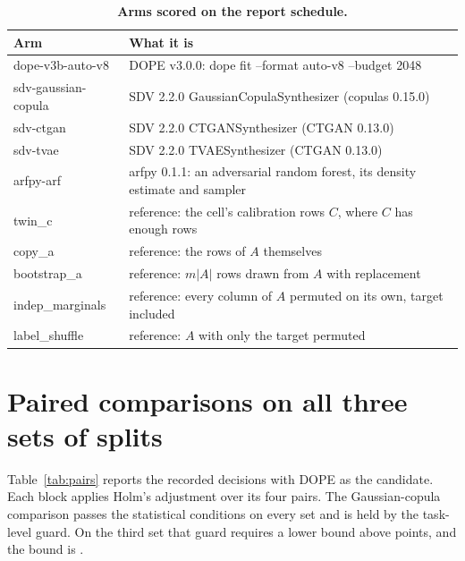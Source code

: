 \documentclass[10pt,letterpaper,twocolumn]{article}
\newcommand{\ct}[1]{{\bfseries\color{ink}#1}}   %
\newcommand{\tcli}[1]{{\ttfamily\fontsize{7.4}{9.4}\selectfont #1}}
\newcommand{\tablefont}{\fontsize{8.1}{10.2}\selectfont}
\newcommand{\thd}[1]{{\sffamily\bfseries\fontsize{7.2}{9}\selectfont\color{ink}#1}}  %
\begin{document}
\begin{table}[t]
\caption{\ct{Arms scored on the report schedule.}}\label{tab:arms}
\tablefont
\begin{tabularx}{\columnwidth}{@{}L{2.75cm}Y@{}}
\toprule
\thd{Arm} & \thd{What it is}\\
\midrule
\tcli{dope-v3b-auto-v8} & DOPE v3.0.0: \tcli{dope fit --format auto-v8 --budget 2048}\\
\tcli{sdv-gaussian-copula} & SDV 2.2.0 \tcli{GaussianCopulaSynthesizer} (copulas 0.15.0)\\
\tcli{sdv-ctgan} & SDV 2.2.0 \tcli{CTGANSynthesizer} (CTGAN 0.13.0)\\
\tcli{sdv-tvae} & SDV 2.2.0 \tcli{TVAESynthesizer} (CTGAN 0.13.0)\\
\tcli{arfpy-arf} & arfpy 0.1.1: an adversarial random forest, its density estimate and sampler\\
\tcli{twin\_c} & reference: the cell's calibration rows $C$, where $C$ has enough rows\\
\tcli{copy\_a} & reference: the rows of $A$ themselves\\
\tcli{bootstrap\_a} & reference: $m|A|$ rows drawn from $A$ with replacement\\
\tcli{indep\_marginals} & reference: every column of $A$ permuted on its own, target included\\
\tcli{label\_shuffle} & reference: $A$ with only the target permuted\\
\bottomrule
\end{tabularx}
\end{table}

\section{Paired comparisons on all three sets of splits}\label{app:pairs}
Table~\ref{tab:pairs} reports the recorded decisions with DOPE as the candidate. Each block applies Holm's adjustment over its four pairs. The Gaussian-copula comparison passes the statistical conditions on every set and is held by the task-level guard. On the third set that guard requires a lower bound above  points, and the bound is .
\end{document}
